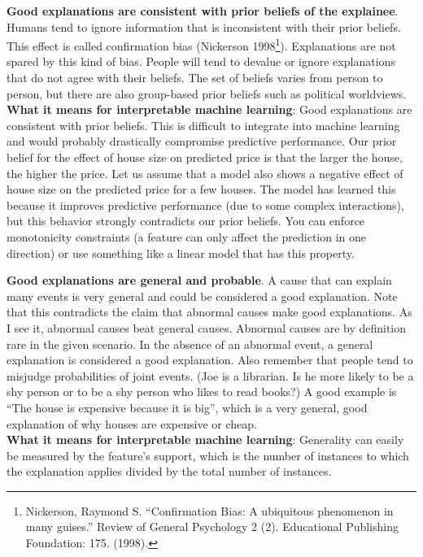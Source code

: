 \documentclass[12pt,]{krantz}
\begin{document}
\textbf{Good explanations are consistent with prior beliefs of the
explainee}. Humans tend to ignore information that is inconsistent with
their prior beliefs. This effect is called confirmation bias (Nickerson
1998\footnote{Nickerson, Raymond S. ``Confirmation Bias: A ubiquitous
  phenomenon in many guises.'' Review of General Psychology 2 (2).
  Educational Publishing Foundation: 175. (1998).}). Explanations are
not spared by this kind of bias. People will tend to devalue or ignore
explanations that do not agree with their beliefs. The set of beliefs
varies from person to person, but there are also group-based prior
beliefs such as political worldviews.\\
\textbf{What it means for interpretable machine learning}: Good
explanations are consistent with prior beliefs. This is difficult to
integrate into machine learning and would probably drastically
compromise predictive performance. Our prior belief for the effect of
house size on predicted price is that the larger the house, the higher
the price. Let us assume that a model also shows a negative effect of
house size on the predicted price for a few houses. The model has
learned this because it improves predictive performance (due to some
complex interactions), but this behavior strongly contradicts our prior
beliefs. You can enforce monotonicity constraints (a feature can only
affect the prediction in one direction) or use something like a linear
model that has this property.

\textbf{Good explanations are general and probable}. A cause that can
explain many events is very general and could be considered a good
explanation. Note that this contradicts the claim that abnormal causes
make good explanations. As I see it, abnormal causes beat general
causes. Abnormal causes are by definition rare in the given scenario. In
the absence of an abnormal event, a general explanation is considered a
good explanation. Also remember that people tend to misjudge
probabilities of joint events. (Joe is a librarian. Is he more likely to
be a shy person or to be a shy person who likes to read books?) A good
example is ``The house is expensive because it is big'', which is a very
general, good explanation of why houses are expensive or cheap.\\
\textbf{What it means for interpretable machine learning}: Generality
can easily be measured by the feature's support, which is the number of
instances to which the explanation applies divided by the total number
of instances.
\end{document}
